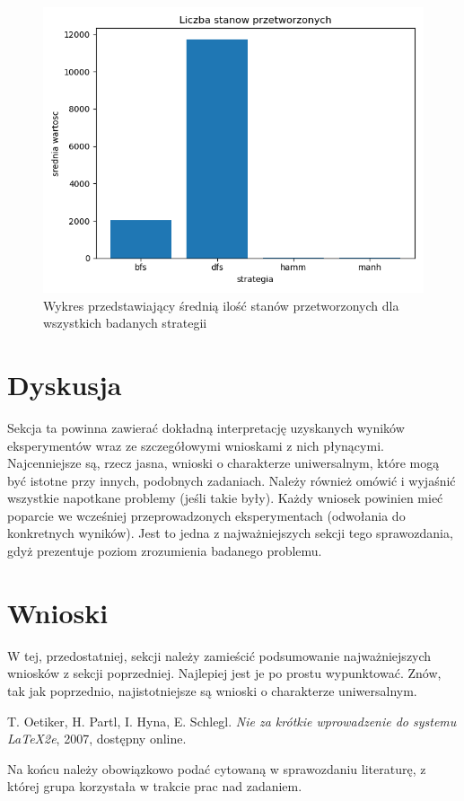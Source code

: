 \documentclass{classrep}
\begin{document}
{\begin{figure}
\includegraphics [scale=0.5]{przetworzone}
\caption{Wykres przedstawiający średnią ilość stanów przetworzonych dla wszystkich badanych strategii}
\end{figure}
}
\newpage
\section{Dyskusja}
{\color{blue}
Sekcja ta powinna zawierać dokładną interpretację uzyskanych wyników
eksperymentów wraz ze szczegółowymi wnioskami z nich płynącymi. Najcenniejsze
są, rzecz jasna, wnioski o charakterze uniwersalnym, które mogą być istotne
przy innych, podobnych zadaniach. Należy również omówić i wyjaśnić wszystkie
napotkane problemy (jeśli takie były). Każdy wniosek powinien mieć poparcie we
wcześniej przeprowadzonych eksperymentach (odwołania do konkretnych wyników).
Jest to jedna z najważniejszych sekcji tego sprawozdania, gdyż prezentuje
poziom zrozumienia badanego problemu.}

\section{Wnioski}
{\color{blue}
W tej, przedostatniej, sekcji należy zamieścić podsumowanie najważniejszych
wniosków z sekcji poprzedniej. Najlepiej jest je po prostu wypunktować. Znów,
tak jak poprzednio, najistotniejsze są wnioski o charakterze uniwersalnym.}

\begin{thebibliography}{0}
   T. Oetiker, H. Partl, I. Hyna, E. Schlegl.
    \textsl{Nie za krótkie wprowadzenie do systemu \LaTeX2e}, 2007, dostępny
    online.
\end{thebibliography}

{\color{blue}
Na końcu należy obowiązkowo podać cytowaną w sprawozdaniu literaturę, z której
grupa korzystała w trakcie prac nad zadaniem.}
\end{document}
